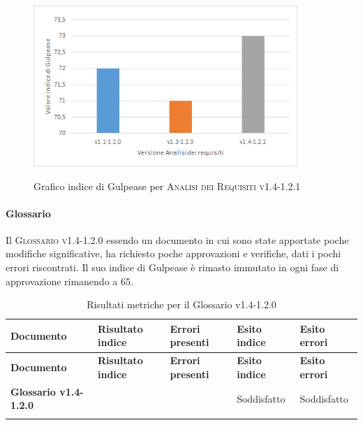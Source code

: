 \documentclass[../piano-di-qualifica.tex]{subfiles}
\begin{document}
\begin{figure}[H]
  \centering
  \includegraphics[width=10cm]{img/gulpeaseAdrv1.4-1.2.1.png}
  \label{fig:gulpease_adr}
  \caption{Grafico indice di Gulpease per \textsc{Analisi dei Requisiti v1.4-1.2.1}}
\end{figure}


\paragraph{Glossario}
\label{sub:glossario}
Il \textsc{Glossario v1.4-1.2.0} essendo un documento in cui sono state apportate poche modifiche significative, ha richiesto poche approvazioni e verifiche, dati i pochi errori riscontrati.
Il suo indice di Gulpease è rimasto immutato in ogni fase di approvazione rimanendo a 65.

\renewcommand{\arraystretch}{2} %
\begin{longtable}[H]{>{\centering\bfseries}m{6cm} >{\centering}m{2cm} >{\centering}m{2.5cm} >{\centering}m{2.5cm} >{\centering\arraybackslash}m{2.5cm}}  
  \rowcolor{lightgray}
  {\textbf{Documento}} & {\textbf{Risultato indice}} & {\textbf{Errori presenti}} & {\textbf{Esito indice}} & {\textbf{Esito errori}}  \\
  \endfirsthead%
  \rowcolor{lightgray}
  {\textbf{Documento}} & {\textbf{Risultato indice}} & {\textbf{Errori presenti}} & {\textbf{Esito indice}} & {\textbf{Esito errori}}  \\
  \endhead%
  \textbf{Glossario v1.4-1.2.0} & 65                 & 0               & Soddisfatto & Soddisfatto \\
  \caption{Risultati metriche per il Glossario v1.4-1.2.0}
  \label{tab:my-table}
\end{longtable}
\end{document}
